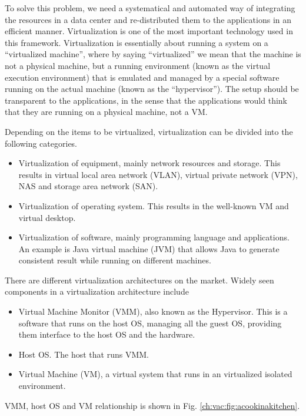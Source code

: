 To solve this problem, we need a systematical and automated way of integrating the resources in a data center and re-distributed them to the applications in an efficient manner. Virtualization is one of the most important technology used in this framework. Virtualization is essentially about running a system on a ``virtualized machine'', where by saying ``virtualized'' we mean that the machine is not a physical machine, but a running environment (known as the virtual execution environment) that is emulated and managed by a special software running on the actual machine (known as the ``hypervisor''). The setup should be transparent to the applications, in the sense that the applications would think that they are running on a physical machine, not a VM.

Depending on the items to be virtualized, virtualization can be divided into the following categories.
\begin{itemize}
  \item Virtualization of equipment, mainly network resources and storage. This results in virtual local area network (VLAN), virtual private network (VPN), NAS and storage area network (SAN).
  \item Virtualization of operating system. This results in the well-known VM and virtual desktop.
  \item Virtualization of software, mainly programming language and applications. An example is Java virtual machine (JVM) that allows Java to generate consistent result while running on different machines.
\end{itemize}

There are different virtualization architectures on the market. Widely seen components in a virtualization architecture include
\begin{itemize}
	\item Virtual Machine Monitor (VMM), also known as the Hypervisor. This is a software that runs on the host OS, managing all the guest OS, providing them interface to the host OS and the hardware.
	\item Host OS. The host that runs VMM.
	\item Virtual Machine (VM), a virtual system that runs in an virtualized isolated environment.
\end{itemize}
VMM, host OS and VM relationship is shown in Fig. \ref{ch:vac:fig:acookinakitchen}.

